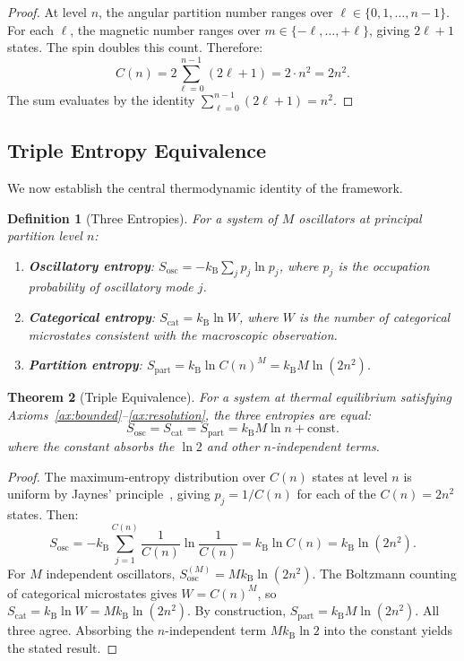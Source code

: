 \documentclass[aps,prd,twocolumn,superscriptaddress,floatfix,nofootinbib]{revtex4-2}
\newtheorem{theorem}{Theorem}[section]
\newtheorem{definition}[theorem]{Definition}
\theoremstyle{remark}
\newcommand{\kB}{k_{\mathrm{B}}}
\newcommand{\Sosc}{S_{\mathrm{osc}}}
\newcommand{\Scat}{S_{\mathrm{cat}}}
\newcommand{\Spart}{S_{\mathrm{part}}}
\begin{document}
\begin{proof}
At level $n$, the angular partition number ranges over $\ell \in \{0, 1, \ldots, n-1\}$. For each $\ell$, the magnetic number ranges over $m \in \{-\ell, \ldots, +\ell\}$, giving $2\ell + 1$ states. The spin doubles this count. Therefore:
\begin{equation}
    C(n) = 2 \sum_{\ell=0}^{n-1}(2\ell + 1) = 2 \cdot n^2 = 2n^2.
\end{equation}
The sum evaluates by the identity $\sum_{\ell=0}^{n-1}(2\ell+1) = n^2$.
\end{proof}

\subsection{Triple Entropy Equivalence}

We now establish the central thermodynamic identity of the framework.

\begin{definition}[Three Entropies]
\label{def:entropies}
For a system of $M$ oscillators at principal partition level $n$:
\begin{enumerate}
    \item \textbf{Oscillatory entropy}: $\Sosc = -\kB \sum_j p_j \ln p_j$, where $p_j$ is the occupation probability of oscillatory mode $j$.
    \item \textbf{Categorical entropy}: $\Scat = \kB \ln W$, where $W$ is the number of categorical microstates consistent with the macroscopic observation.
    \item \textbf{Partition entropy}: $\Spart = \kB \ln C(n)^M = \kB M \ln(2n^2)$.
\end{enumerate}
\end{definition}

\begin{theorem}[Triple Equivalence]
\label{thm:triple}
For a system at thermal equilibrium satisfying Axioms~\ref{ax:bounded}--\ref{ax:resolution}, the three entropies are equal:
\begin{equation}
    \boxed{\Sosc = \Scat = \Spart = \kB M \ln n + \text{const.}}
    \label{eq:triple}
\end{equation}
where the constant absorbs the $\ln 2$ and other $n$-independent terms.
\end{theorem}

\begin{proof}
The maximum-entropy distribution over $C(n)$ states at level $n$ is uniform by Jaynes' principle~\cite{jaynes1957information1,jaynes1957information2}, giving $p_j = 1/C(n)$ for each of the $C(n) = 2n^2$ states. Then:
\begin{equation}
    \Sosc = -\kB \sum_{j=1}^{C(n)} \frac{1}{C(n)} \ln \frac{1}{C(n)} = \kB \ln C(n) = \kB \ln(2n^2).
\end{equation}
For $M$ independent oscillators, $\Sosc^{(M)} = M \kB \ln(2n^2)$. The Boltzmann counting of categorical microstates gives $W = C(n)^M$, so $\Scat = \kB \ln W = M \kB \ln(2n^2)$. By construction, $\Spart = \kB M \ln(2n^2)$. All three agree. Absorbing the $n$-independent term $M\kB \ln 2$ into the constant yields the stated result.
\end{proof}
\end{document}
